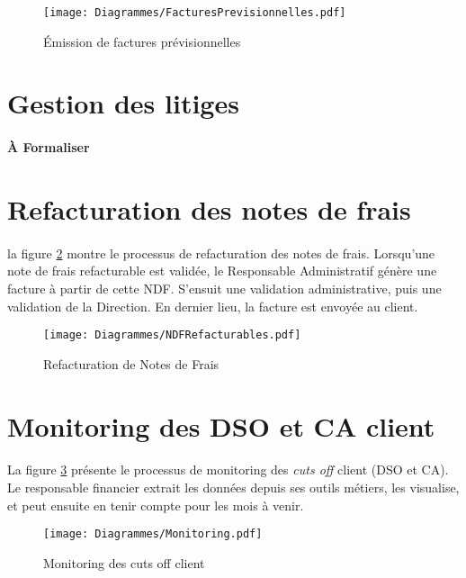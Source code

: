 \begin{figure}
	\centering
		\texttt{[image: Diagrammes/FacturesPrevisionnelles.pdf]}
	\caption{Émission de factures prévisionnelles}
	\label{validationFactures}	
\end{figure}


\section{Gestion des litiges}
\paragraph{À Formaliser}


\section{Refacturation des notes de frais}
\paragraph{} la figure \ref{NDFRefacturables} montre le processus de refacturation des notes de frais. Lorsqu'une note de frais refacturable est validée, le Responsable Administratif génère une facture à partir de cette NDF. S'ensuit une validation administrative, puis une validation de la Direction. En dernier lieu, la facture est envoyée au client.


\begin{figure}
	\centering
		\texttt{[image: Diagrammes/NDFRefacturables.pdf]}
	\caption{Refacturation de Notes de Frais}
	\label{NDFRefacturables}	
\end{figure}


\section{Monitoring des DSO et CA client}

\paragraph{} La figure \ref{monitoringCO} présente le processus de monitoring des \textit{cuts off} client (DSO et CA). Le responsable financier extrait les données depuis ses outils métiers, les visualise, et peut ensuite en tenir compte pour les mois à venir.


\begin{figure}
	\centering
		\texttt{[image: Diagrammes/Monitoring.pdf]}
	\caption{Monitoring des cuts off client}
	\label{monitoringCO}	
\end{figure}
